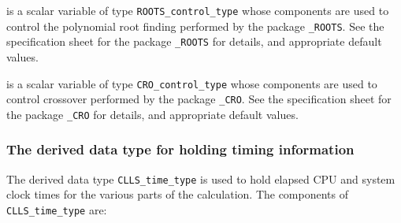 \documentclass{galahad}
\newcommand{\packagename}{CLLS}
\begin{document}
\begin{description}
 is a scalar variable of type
{\tt ROOTS\_control\_type}
whose components are used to control the polynomial root finding
performed by the package
{\tt \libraryname\_ROOTS}.
See the specification sheet for the package
{\tt \libraryname\_ROOTS}
for details, and appropriate default values.

 is a scalar variable of type
{\tt CRO\_control\_type}
whose components are used to control crossover
performed by the package
{\tt \libraryname\_CRO}.
See the specification sheet for the package
{\tt \libraryname\_CRO}
for details, and appropriate default values.

\end{description}


\subsubsection{The derived data type for holding timing
 information}\label{typetime}
The derived data type
{\tt \packagename\_time\_type}
is used to hold elapsed CPU and system clock times for the various parts of
the calculation. The components of
{\tt \packagename\_time\_type}
are:
\end{document}
